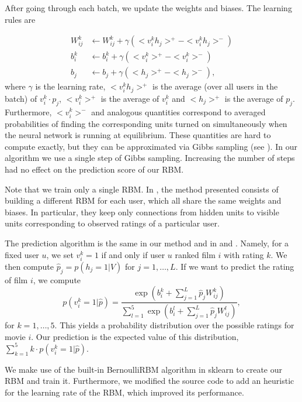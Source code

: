\documentclass[10pt,conference,compsocconf]{IEEEtran}
\begin{document}
After going through each batch, we update the weights and biases. The learning rules are

\begin{equation}
\begin{split}
W^k_{ij} &\leftarrow W^k_{ij} + \gamma(<v^k_ih_j>^+-<v^k_ih_j>^-)\\
b^k_i &\leftarrow b^k_i + \gamma(<v^k_i>^+-<v^k_i>^-)\\
b_j &\leftarrow b_j + \gamma(<h_j>^+-<h_j>^-),
\end{split}
\end{equation}
where $\gamma$ is the learning rate, $<v^k_ih_j>^+$ is the average (over all users in the batch) of $v^k_i\cdot p_j$, $<v^k_i>^+$ is the average of $v^k_i$ and $<h_j>^+$ is the average of $p_j$. Furthermore, $<v^k_i>^-$ and analogous quantities correspond to averaged probabilities of finding the corresponding units turned on simultaneously  when the neural network is running at equilibrium. These quantities are hard to compute exactly, but they can be approximated via Gibbs sampling (see \cite{H02}). In our algorithm we use a single step of Gibbs sampling. Increasing the number of steps had no effect on the prediction score of our RBM.

Note that we train only a single RBM. In \cite{SMH07}, the method presented consists of building a different RBM for each user, which all share the same weights and biases. In particular, they keep only connections from hidden units to visible units corresponding to observed ratings of a particular user.

The prediction algorithm is the same in our method and in \cite{SMH07} and \cite{L10}. Namely, for a fixed user $u$, we set $v^k_i=1$ if and only if user $u$ ranked film $i$ with rating $k$. We then compute $\hat{p}_j=p(h_j=1|V)$ for $j=1,\dots, L$. If we want to predict the rating of film $i$, we compute
\begin{equation}
	p(v^k_i=1|\hat{p})=\frac{\exp(b^k_i+\sum_{j=1}^L \hat{p}_jW^k_{ij})}{\sum_{l=1}^{5}\exp(b^l_i+\sum_{j=1}^{L}\hat{p}_jW^l_{ij})},
\end{equation}
for $k=1,\dots, 5$. This yields a probability distribution over the possible ratings for movie $i$. Our prediction is the expected value of this distribution, $\sum_{k=1}^{5}k\cdot p(v^k_i=1|\hat{p})$.

We make use of the built-in BernoulliRBM algorithm in sklearn to create our RBM and train it. Furthermore, we modified the source code to add an heuristic for the learning rate of the RBM, which improved its performance.
\end{document}
